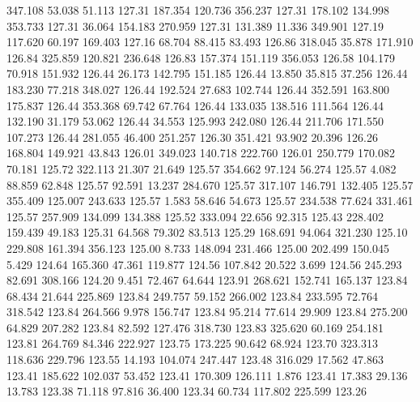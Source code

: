  347.108   53.038   51.113       127.31
 187.354  120.736  356.237       127.31
 178.102  134.998  353.733       127.31
  36.064  154.183  270.959       127.31
 131.389   11.336  349.901       127.19
 117.620   60.197  169.403       127.16
  68.704   88.415   83.493       126.86
 318.045   35.878  171.910       126.84
 325.859  120.821  236.648       126.83
 157.374  151.119  356.053       126.58
 104.179   70.918  151.932       126.44
  26.173  142.795  151.185       126.44
  13.850   35.815   37.256       126.44
 183.230   77.218  348.027       126.44
 192.524   27.683  102.744       126.44
 352.591  163.800  175.837       126.44
 353.368   69.742   67.764       126.44
 133.035  138.516  111.564       126.44
 132.190   31.179   53.062       126.44
  34.553  125.993  242.080       126.44
 211.706  171.550  107.273       126.44
 281.055   46.400  251.257       126.30
 351.421   93.902   20.396       126.26
 168.804  149.921   43.843       126.01
 349.023  140.718  222.760       126.01
 250.779  170.082   70.181       125.72
 322.113   21.307   21.649       125.57
 354.662   97.124   56.274       125.57
   4.082   88.859   62.848       125.57
  92.591   13.237  284.670       125.57
 317.107  146.791  132.405       125.57
 355.409  125.007  243.633       125.57
   1.583   58.646   54.673       125.57
 234.538   77.624  331.461       125.57
 257.909  134.099  134.388       125.52
 333.094   22.656   92.315       125.43
 228.402  159.439   49.183       125.31
  64.568   79.302   83.513       125.29
 168.691   94.064  321.230       125.10
 229.808  161.394  356.123       125.00
   8.733  148.094  231.466       125.00
 202.499  150.045    5.429       124.64
 165.360   47.361  119.877       124.56
 107.842   20.522    3.699       124.56
 245.293   82.691  308.166       124.20
   9.451   72.467   64.644       123.91
 268.621  152.741  165.137       123.84
  68.434   21.644  225.869       123.84
 249.757   59.152  266.002       123.84
 233.595   72.764  318.542       123.84
 264.566    9.978  156.747       123.84
  95.214   77.614   29.909       123.84
 275.200   64.829  207.282       123.84
  82.592  127.476  318.730       123.83
 325.620   60.169  254.181       123.81
 264.769   84.346  222.927       123.75
 173.225   90.642   68.924       123.70
 323.313  118.636  229.796       123.55
  14.193  104.074  247.447       123.48
 316.029   17.562   47.863       123.41
 185.622  102.037   53.452       123.41
 170.309  126.111    1.876       123.41
  17.383   29.136   13.783       123.38
  71.118   97.816   36.400       123.34
  60.734  117.802  225.599       123.26
